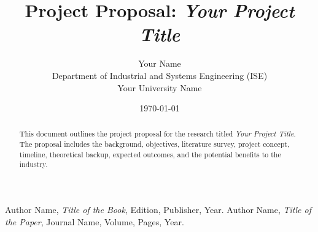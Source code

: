 \documentclass[a4paper,12pt]{article}
\begin{document}
\title{Project Proposal: \textit{Your Project Title}}
\author{Your Name \\
        Department of Industrial and Systems Engineering (ISE) \\
        Your University Name}
\date{\today}

\maketitle

\begin{abstract}
This document outlines the project proposal for the research titled \textit{Your Project Title}. The proposal includes the background, objectives, literature survey, project concept, timeline, theoretical backup, expected outcomes, and the potential benefits to the industry.
\end{abstract}












\newpage
\begin{thebibliography}{9}
 Author Name, \textit{Title of the Book}, Edition, Publisher, Year.
 Author Name, \textit{Title of the Paper}, Journal Name, Volume, Pages, Year.
\end{thebibliography}
\end{document}
